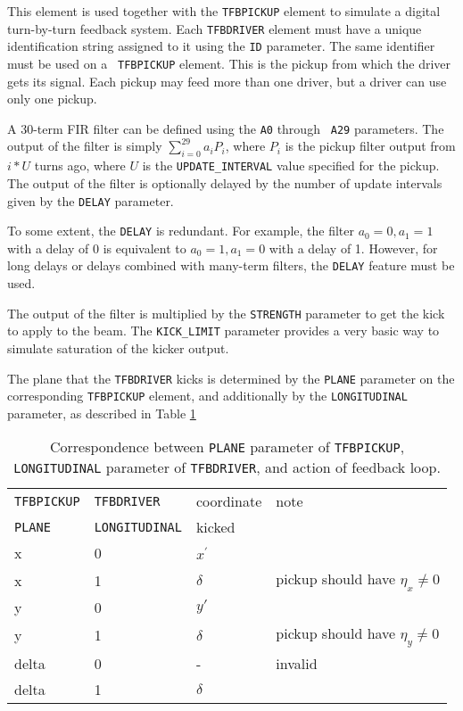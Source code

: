 This element is used together with the {\tt TFBPICKUP} element to
simulate a digital turn-by-turn feedback system.  Each {\tt TFBDRIVER}
element must have a unique identification string assigned to it using
the {\tt ID} parameter.  The same identifier must be used on a {\tt
TFBPICKUP} element.  This is the pickup from which the driver gets its
signal.  Each pickup may feed more than one driver, but a driver can
use only one pickup.

A 30-term FIR filter can be defined using the {\tt A0} through {\tt
A29} parameters.  The output of the filter is simply $\sum_{i=0}^{29}
a_i P_i$, where $P_i$ is the pickup filter output from $i*U$ turns ago,
where $U$ is the \verb|UPDATE_INTERVAL| value specified for the pickup.
The output of the filter is optionally delayed by the number of update intervals
given by the {\tt DELAY} parameter.

To some extent, the {\tt DELAY} is redundant.  For example, the filter
$a_0=0, a_1=1$ with a delay of 0 is equivalent to $a_0=1, a_1=0$ with
a delay of 1.  However, for long delays or delays combined with
many-term filters, the {\tt DELAY} feature must be used.

The output of the filter is multiplied by the {\tt STRENGTH} parameter
to get the kick to apply to the beam.  The {\tt KICK\_LIMIT} parameter
provides a very basic way to simulate saturation of the kicker output.

The plane that the \verb|TFBDRIVER| kicks is determined by the 
\verb|PLANE| parameter on the corresponding \verb|TFBPICKUP| element, and
additionally by the \verb|LONGITUDINAL| parameter, as described in 
Table \ref{tab:tfbdriver}

\begin{table}[htb]
\begin{tabular}{llll}
\hline
\verb|TFBPICKUP| & \verb|TFBDRIVER| & coordinate & note \\
\verb|PLANE| & \verb|LONGITUDINAL| & kicked & \\
\hline
x & 0 & $x^\prime$ & \\
x & 1 & $\delta$ & pickup should have $\eta_x\neq 0$ \\
y & 0 & $y\prime$ & \\
y & 1 & $\delta$ & pickup should have $\eta_y\neq 0$ \\
delta & 0 & - & invalid \\
delta & 1 & $\delta$ & \\
\hline
\end{tabular}
\caption{Correspondence between {\tt PLANE} parameter of {\tt TFBPICKUP}, {\tt LONGITUDINAL} parameter of {\tt TFBDRIVER}, and action of feedback loop.}
\label{tab:tfbdriver}
\end{table}

